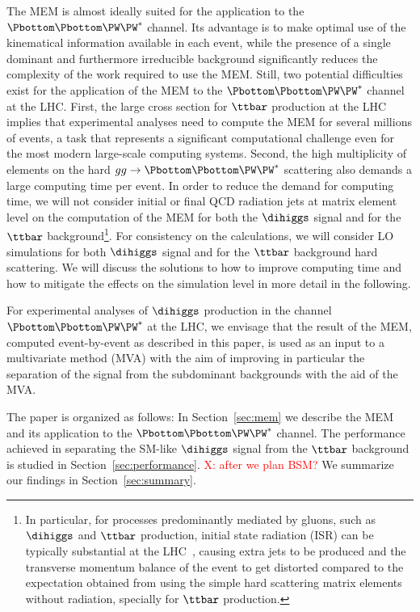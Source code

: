 The MEM is almost ideally suited for the application to the $\Pbottom\Pbottom\PW\PW^{*}$ channel.
Its advantage is to make optimal use of the kinematical information available in each event,
while the presence of a single dominant and furthermore irreducible background significantly reduces the complexity of the work required to use the MEM. 
Still, two potential difficulties exist for the application of the MEM to the $\Pbottom\Pbottom\PW\PW^{*}$ channel at the LHC.
First, the large cross section for $\ttbar$ production at the LHC implies that experimental analyses need to compute the MEM for several millions of events,
a task that represents a significant computational challenge even for the most modern large-scale computing systems. Second, the high multiplicity of elements on the hard $gg\to\Pbottom\Pbottom\PW\PW^{*}$ scattering  also demands a large computing time per event. 
 In order to reduce the demand for computing time,
we will not consider initial or final QCD radiation jets at matrix element level on the computation of the MEM for both the $\dihiggs$ signal and for the $\ttbar$ background\footnote{In particular, for processes predominantly mediated by gluons, such as $\dihiggs$ and $\ttbar$ production,
initial state radiation (ISR) can be typically substantial at the LHC~\cite{Alwall:2010cq},
causing extra jets to be produced and the transverse momentum balance of the event to get distorted compared to the expectation obtained from using the simple hard scattering matrix elements without radiation, specially for $\ttbar$ production.}.
 For consistency on the calculations, we will consider LO simulations for both  $\dihiggs$ signal and for the $\ttbar$ background hard scattering. 
We will discuss the solutions to  how to improve computing time and how to mitigate the effects on the simulation level in more detail in the following. 

For experimental analyses of $\dihiggs$ production in the channel $\Pbottom\Pbottom\PW\PW^{*}$ at the LHC,
we envisage that the result of the MEM, computed event-by-event as described in this paper, 
is used as an input to a multivariate method (MVA) 
with the aim of improving in particular the separation of the signal from the subdominant backgrounds with the aid of the MVA.  

The paper is organized as follows:
In Section~\ref{sec:mem} we describe the MEM and its application to the $\Pbottom\Pbottom\PW\PW^{*}$ channel.
The performance achieved in separating the SM-like $\dihiggs$ signal from the $\ttbar$ background is studied in Section~\ref{sec:performance}. 
\textcolor{red}{X: after we plan BSM? } 
We summarize our findings in Section~\ref{sec:summary}.